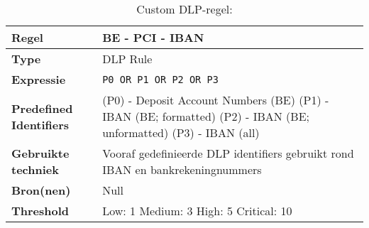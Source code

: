\begin{table}[h]
    \centering
    \small
    \begin{tabular}{p{4cm} p{10cm}}
        \toprule
        \textbf{Regel} & BE - PCI - IBAN \\
        \midrule
        \textbf{Type} & DLP Rule \\
        \textbf{Expressie} & \texttt{P0 OR P1 OR P2 OR P3 } \\
        \textbf{Predefined Identifiers} & 
        (P0) - Deposit Account Numbers (BE)
        (P1) - IBAN (BE; formatted)
        (P2) - IBAN (BE; unformatted)
        (P3) - IBAN (all) \\
        \textbf{Gebruikte techniek} & Vooraf gedefinieerde DLP identifiers gebruikt rond IBAN en bankrekeningnummers \\
        \textbf{Bron(nen)} & Null \\
        \textbf{Threshold} & Low: 1 \quad Medium: 3 \quad High: 5 \quad Critical: 10 \\
        \bottomrule
    \end{tabular}
    \caption{Custom DLP-regel: }
    \label{tab:custom-be-iban}
\end{table}


